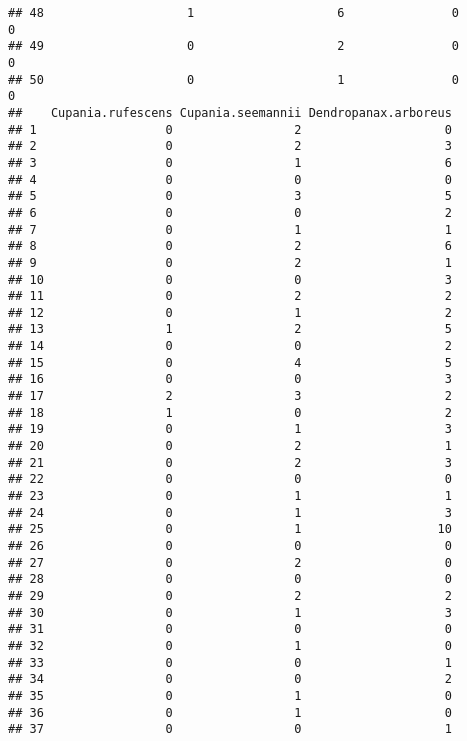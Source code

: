 \documentclass[
]{article}
\begin{document}
\begin{verbatim}
## 48                    1                    6               0                 0
## 49                    0                    2               0                 0
## 50                    0                    1               0                 0
##    Cupania.rufescens Cupania.seemannii Dendropanax.arboreus
## 1                  0                 2                    0
## 2                  0                 2                    3
## 3                  0                 1                    6
## 4                  0                 0                    0
## 5                  0                 3                    5
## 6                  0                 0                    2
## 7                  0                 1                    1
## 8                  0                 2                    6
## 9                  0                 2                    1
## 10                 0                 0                    3
## 11                 0                 2                    2
## 12                 0                 1                    2
## 13                 1                 2                    5
## 14                 0                 0                    2
## 15                 0                 4                    5
## 16                 0                 0                    3
## 17                 2                 3                    2
## 18                 1                 0                    2
## 19                 0                 1                    3
## 20                 0                 2                    1
## 21                 0                 2                    3
## 22                 0                 0                    0
## 23                 0                 1                    1
## 24                 0                 1                    3
## 25                 0                 1                   10
## 26                 0                 0                    0
## 27                 0                 2                    0
## 28                 0                 0                    0
## 29                 0                 2                    2
## 30                 0                 1                    3
## 31                 0                 0                    0
## 32                 0                 1                    0
## 33                 0                 0                    1
## 34                 0                 0                    2
## 35                 0                 1                    0
## 36                 0                 1                    0
## 37                 0                 0                    1

\end{verbatim}
\end{document}
